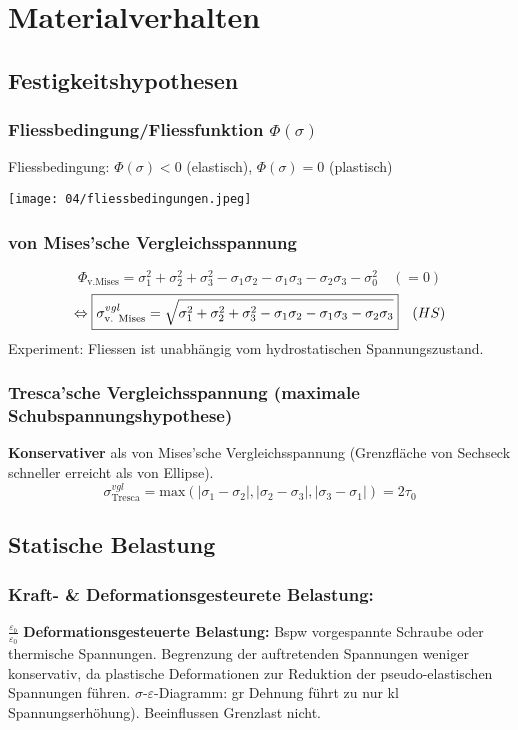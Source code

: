 \vspace{-3mm}
\section{Materialverhalten}{}
    \subsection{Festigkeitshypothesen}
        \subsubsection{Fliessbedingung/Fliessfunktion $\Phi(\sigma)$}
            Fliessbedingung: $\Phi(\sigma)<0$ (elastisch), $\Phi(\sigma)=0$ (plastisch)
            \begin{center}
                \texttt{[image: 04/fliessbedingungen.jpeg]}
            \end{center}
            
        \subsubsection{von Mises'sche Vergleichsspannung}
            \[\Phi_{\textrm{v.Mises}}= \sigma_1^2+\sigma_2^2+\sigma_3^2-\sigma_1\sigma_2-\sigma_1\sigma_3-\sigma_2\sigma_3 -\sigma_0^2\quad(=0)\]
            \[\Leftrightarrow \boxed{\sigma_{\textrm{v. Mises}}^{vgl}= \sqrt{\sigma_1^2+\sigma_2^2+\sigma_3^2-\sigma_1\sigma_2-\sigma_1\sigma_3-\sigma_2\sigma_3}} \quad\textrm(HS)\]
            Experiment: Fliessen ist unabhängig vom hydrostatischen Spannungszustand.
        \subsubsection{Tresca'sche Vergleichsspannung (maximale Schubspannungshypothese)}
            \textbf{Konservativer} als von Mises'sche Vergleichsspannung (Grenzfläche von Sechseck schneller erreicht als von Ellipse).
            \vspace{-2mm}
            \[\boxed{\sigma_{\textrm{Tresca}}^{vgl}=\textrm{max} \left(|\sigma_1-\sigma_2|,|\sigma_2-\sigma_3|,|\sigma_3-\sigma_1| \right) =2\tau_0}\]
            \vspace{-2mm}
    \subsection{Statische Belastung}
        
            \subsubsection{Kraft- \& Deformationsgesteurete Belastung:}
            $\frac{\varepsilon_b}{\varepsilon_0}$ \textbf{Deformationsgesteuerte Belastung:} Bspw vorgespannte Schraube oder thermische Spannungen. Begrenzung der auftretenden Spannungen weniger konservativ, da plastische Deformationen zur Reduktion der pseudo-elastischen Spannungen führen. $\sigma$-$\varepsilon$-Diagramm: gr Dehnung führt zu nur kl Spannungserhöhung). Beeinflussen Grenzlast nicht.
            
